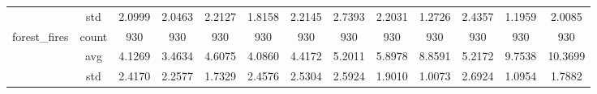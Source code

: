 \begin{table}[htbp]
{\begin{tabular}{rcccccccccccc}
                                                     & std                                    & 2.0999                                                                             & 2.0463                                                                    & 2.2127                                                                    & 1.8158                                                                    & 2.2145                                        & 2.7393                                      & 2.2031                                         & 1.2726                                         & 2.4357                                         & 1.1959                                         & 2.0085                                         \\
                  forest\_fires                      & count                                  & 930                                                                                & 930                                                                       & 930                                                                       & 930                                                                       & 930                                           & 930                                         & 930                                            & 930                                            & 930                                            & 930                                            & 930                                            \\
                                                     & avg                                    & 4.1269                                                                             & \cellcolor[rgb]{ .776,  .937,  .808}\textcolor[rgb]{ 0,  .38,  0}{3.4634} & 4.6075                                                                    & 4.0860                                                                    & 4.4172                                        & 5.2011                                      & 5.8978                                         & 8.8591                                         & 5.2172                                         & 9.7538                                         & 10.3699                                        \\
                                                     & std                                    & 2.4170                                                                             & 2.2577                                                                    & 1.7329                                                                    & 2.4576                                                                    & 2.5304                                        & 2.5924                                      & 1.9010                                         & 1.0073                                         & 2.6924                                         & 1.0954                                         & 1.7882                                         \\

\end{tabular}}
\end{table}
